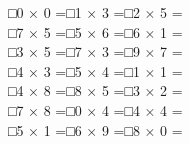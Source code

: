 \documentclass[uplatex,
paper=a4,
fontsize=18pt,
jafontsize=16pt,
number_of_lines=30,
line_length=30zh,
baselineskip=25pt,
]{jlreq}
\begin{document}
□\hspace{1em}0 × 0 =\hspace{3em}□\hspace{1em}1 × 3 =\hspace{3em}□\hspace{1em}2 × 5 =\hspace{3em}
\\

□\hspace{1em}7 × 5 =\hspace{3em}□\hspace{1em}5 × 6 =\hspace{3em}□\hspace{1em}6 × 1 =\hspace{3em}
\\

□\hspace{1em}3 × 5 =\hspace{3em}□\hspace{1em}7 × 3 =\hspace{3em}□\hspace{1em}9 × 7 =\hspace{3em}
\\

□\hspace{1em}4 × 3 =\hspace{3em}□\hspace{1em}5 × 4 =\hspace{3em}□\hspace{1em}1 × 1 =\hspace{3em}
\\

□\hspace{1em}4 × 8 =\hspace{3em}□\hspace{1em}8 × 5 =\hspace{3em}□\hspace{1em}3 × 2 =\hspace{3em}
\\

□\hspace{1em}7 × 8 =\hspace{3em}□\hspace{1em}0 × 4 =\hspace{3em}□\hspace{1em}4 × 4 =\hspace{3em}
\\

□\hspace{1em}5 × 1 =\hspace{3em}□\hspace{1em}6 × 9 =\hspace{3em}□\hspace{1em}8 × 0 =\hspace{3em}
\\
\end{document}
